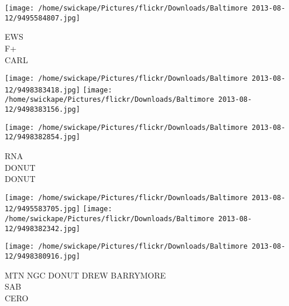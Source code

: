 \documentclass[10pt,letterpaper]{article}
\begin{document}
\vspace{0.25in}
\texttt{[image: /home/swickape/Pictures/flickr/Downloads/Baltimore 2013-08-12/9495584807.jpg]}

EWS\\
F+\\
CARL
\pagebreak

\texttt{[image: /home/swickape/Pictures/flickr/Downloads/Baltimore 2013-08-12/9498383418.jpg]}
\texttt{[image: /home/swickape/Pictures/flickr/Downloads/Baltimore 2013-08-12/9498383156.jpg]}

\vspace{0.25in}
\texttt{[image: /home/swickape/Pictures/flickr/Downloads/Baltimore 2013-08-12/9498382854.jpg]}

RNA\\
DONUT\\
DONUT
\pagebreak

\texttt{[image: /home/swickape/Pictures/flickr/Downloads/Baltimore 2013-08-12/9495583705.jpg]}
\texttt{[image: /home/swickape/Pictures/flickr/Downloads/Baltimore 2013-08-12/9498382342.jpg]}

\vspace{0.25in}
\texttt{[image: /home/swickape/Pictures/flickr/Downloads/Baltimore 2013-08-12/9498380916.jpg]}

MTN NGC DONUT DREW BARRYMORE\\
SAB\\
CERO
\pagebreak
\end{document}

